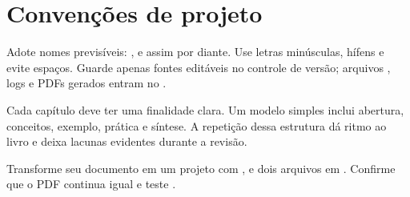 \section{Convenções de projeto}

Adote nomes previsíveis: ,
 e assim por diante. Use letras minúsculas, hífens e
evite espaços. Guarde apenas fontes editáveis no controle de versão; arquivos
, logs e PDFs gerados entram no .

Cada capítulo deve ter uma finalidade clara. Um modelo simples inclui abertura,
conceitos, exemplo, prática e síntese. A repetição dessa estrutura dá ritmo ao
livro e deixa lacunas evidentes durante a revisão.

\begin{pratica}
  Transforme seu documento em um projeto com ,
   e dois arquivos em . Confirme que o
  PDF continua igual e teste .
\end{pratica}

